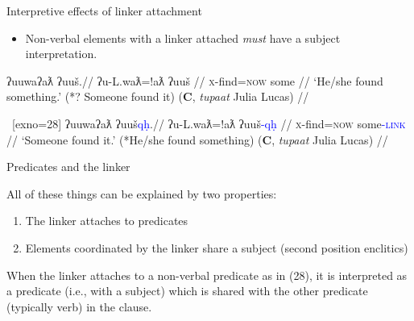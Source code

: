 \begin{frame}{Interpretive effects of linker attachment}

\begin{itemize}
\item Non-verbal elements with a linker attached \textit{must} have a subject interpretation.
\end{itemize}

\ex[exno=27]
\begingl
\glpreamble ʔuuwaʔaƛ ʔuuš.//
\gla ʔu-L.waƛ=!aƛ ʔuuš //
\glb \textsc{x}-find=\textsc{now} some //
\glft `He/she found something.' (*? Someone found it) (\textbf{C}, \textit{tupaat} Julia Lucas) //
\endgl \label{ex:findsomething}
\xe

\ex~[exno=28]
\begingl
\glpreamble ʔuuwaʔaƛ ʔuuš\textcolor{blue}{qḥ}.//
\gla ʔu-L.waƛ=!aƛ ʔuuš\textcolor{blue}{-qḥ} //
\glb \textsc{x}-find=\textsc{now} some\textcolor{blue}{-\textsc{link}} //
\glft `Someone found it.' (*He/she found something) (\textbf{C}, \textit{tupaat} Julia Lucas) //
\endgl \label{ex:findsomeone}
\xe
	
\end{frame}

\begin{frame}{Predicates and the linker}

All of these things can be explained by two properties:

\begin{enumerate}
\item The linker attaches to predicates
\item Elements coordinated by the linker share a subject (second position enclitics)
\end{enumerate}

When the linker attaches to a non-verbal predicate as in (28), it is interpreted as a predicate (i.e., with a subject) which is shared with the other predicate (typically verb) in the clause.

\end{frame}

